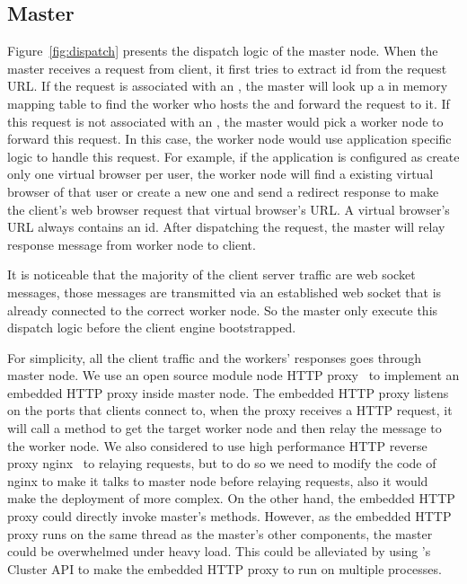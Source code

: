 \newarchitectureoverview{}

\subsection{Master}
Figure~\ref{fig:dispatch} presents the dispatch logic of the master node.
When the master receives a request from client,
it first tries to extract \appins{} id from the request URL.
If the request is associated with an \appins{},
the master will look up a in memory mapping table to find the worker
who hosts the \appins{} and forward the request to it.
If this request is not associated with an \appins{},
the master would pick a worker node to forward this request.
In this case, the worker node would use application specific logic to handle this request.
For example, if the application is configured as create only one virtual browser per user,
the worker node will find a existing virtual browser of that user or create a new one
and send a redirect response to make the client's web browser request that virtual browser's URL.
A virtual browser's URL always contains an \appins{} id.
After dispatching the request,
the master will relay response message from worker node to client.

It is noticeable that the majority of the client server traffic are web socket messages,
those messages are transmitted via an established web socket that is already connected to the 
correct worker node.
So the master only execute this dispatch logic before the client engine bootstrapped.

For simplicity, all the client traffic and the workers' responses goes through master node.
We use an open source \nodejs{} module node HTTP proxy~\cite{nodeproxy} to implement
an embedded HTTP proxy inside master node.
The embedded HTTP proxy listens on the ports that clients connect to,
when the proxy receives a HTTP request,
it will call a method to get the target worker node and then relay the message
to the worker node.
We also considered to use high performance HTTP reverse proxy nginx~\cite{nginx}
to relaying requests,
but to do so we need to modify the code of nginx to 
make it talks to master node before relaying requests,
also it would make the deployment of \cb{} more complex.
On the other hand, the embedded HTTP proxy could directly invoke master's methods.
However, as the embedded HTTP proxy runs on the same thread as the master's other
components, the master could be overwhelmed under heavy load.
This could be alleviated by using \nodejs{}'s Cluster API to make the embedded HTTP
proxy to run on multiple processes.

